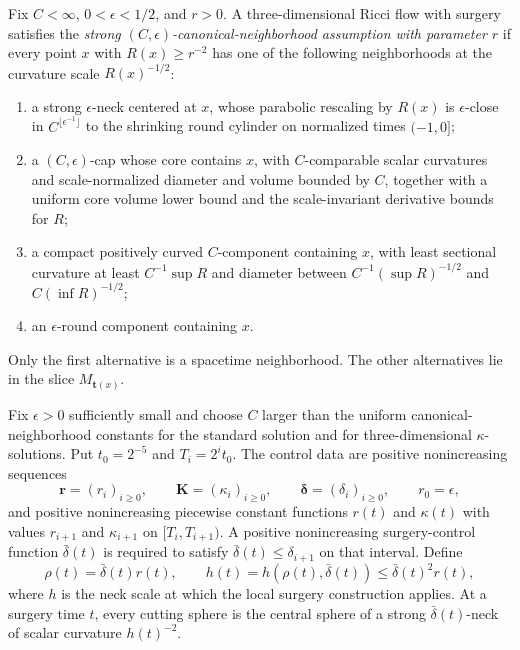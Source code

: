 \begin{definition}
\label{def:strong-canonical-neighborhood-control}
\notready
Fix $C<\infty$, $0<\epsilon<1/2$, and $r>0$.  A three-dimensional Ricci
flow with surgery satisfies the \emph{strong
$(C,\epsilon)$-canonical-neighborhood assumption with parameter $r$} if
every point $x$ with $R(x)\ge r^{-2}$ has one of the following
neighborhoods at the curvature scale $R(x)^{-1/2}$:
\begin{enumerate}
\item a strong $\epsilon$-neck centered at $x$, whose parabolic rescaling by
      $R(x)$ is $\epsilon$-close in
      $C^{\lfloor\epsilon^{-1}\rfloor}$ to the shrinking round cylinder on
      normalized times $(-1,0]$;
\item a $(C,\epsilon)$-cap whose core contains $x$, with $C$-comparable
      scalar curvatures and scale-normalized diameter and volume bounded by
      $C$, together with a uniform core volume lower bound and the
      scale-invariant derivative bounds for $R$;
\item a compact positively curved $C$-component containing $x$, with
      least sectional curvature at least $C^{-1}\sup R$ and diameter between
      $C^{-1}(\sup R)^{-1/2}$ and $C(\inf R)^{-1/2}$;
\item an $\epsilon$-round component containing $x$.
\end{enumerate}
Only the first alternative is a spacetime neighborhood.  The other
alternatives lie in the slice $M_{\mathbf t(x)}$.
\end{definition}

\begin{definition}
\label{def:controlled-surgery-parameters}
\notready
Fix $\epsilon>0$ sufficiently small and choose $C$ larger than the uniform
canonical-neighborhood constants for the standard solution and for
three-dimensional $\kappa$-solutions.  Put $t_0=2^{-5}$ and
$T_i=2^it_0$.  The control data are positive nonincreasing sequences
\[
 \mathbf r=(r_i)_{i\ge0},\qquad
 \mathbf K=(\kappa_i)_{i\ge0},\qquad
 \boldsymbol\delta=(\delta_i)_{i\ge0},
 \qquad r_0=\epsilon,
\]
and positive nonincreasing piecewise constant functions $r(t)$ and
$\kappa(t)$ with values $r_{i+1}$ and $\kappa_{i+1}$ on
$[T_i,T_{i+1})$.  A positive nonincreasing surgery-control function
$\bar\delta(t)$ is required to satisfy
$\bar\delta(t)\le\delta_{i+1}$ on that interval.  Define
\[
 \rho(t)=\bar\delta(t)r(t),
 \qquad
 h(t)=h(\rho(t),\bar\delta(t))
 \le \bar\delta(t)^2r(t),
\]
where $h$ is the neck scale at which the local surgery construction applies.
At a surgery time $t$, every cutting sphere is the central sphere of a strong
$\bar\delta(t)$-neck of scalar curvature $h(t)^{-2}$.
\end{definition}


